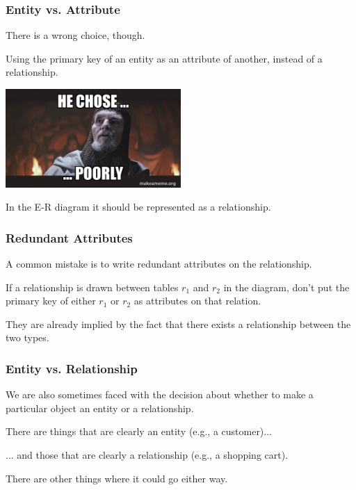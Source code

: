 \begin{frame}
\frametitle{Entity vs. Attribute}

There is a wrong choice, though.

Using the primary key of an entity as an attribute of another, instead of a relationship.

\begin{center}
	\includegraphics[width=0.5\textwidth]{images/poorly.jpg}
\end{center}

In the E-R diagram it should be represented as a relationship.

\end{frame}



\begin{frame}
\frametitle{Redundant Attributes}

A common mistake is to write redundant attributes on the relationship. 

If a relationship is drawn between tables $r_{1}$ and $r_{2}$ in the diagram, don't put the primary key of either $r_{1}$ or $r_{2}$ as attributes on that relation.

They are already implied by the fact that there exists a relationship between the two types. 

\end{frame}



\begin{frame}
\frametitle{Entity vs. Relationship}

We are also sometimes faced with the decision about whether to make a particular object an entity or a relationship. 

There are things that are clearly an entity (e.g., a customer)...

... and those that are clearly a relationship (e.g., a shopping cart).

There are other things where it could go either way. 

\end{frame}




